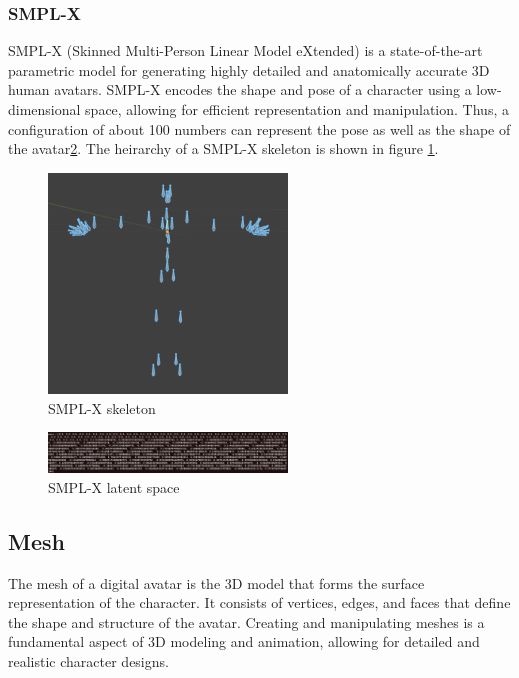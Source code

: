 \subsubsection{SMPL-X}

SMPL-X (Skinned Multi-Person Linear Model eXtended) is a state-of-the-art parametric model for generating highly detailed and anatomically accurate 3D human avatars. SMPL-X encodes the shape and pose of a character using a low-dimensional space, allowing for efficient representation and manipulation. Thus, a configuration of about 100 numbers can represent the pose as well as the shape of the avatar\ref{fig:latent_space_smplx}. The heirarchy of a SMPL-X skeleton is shown in figure \ref{fig:smpl_x_skeleton}.

\begin{figure}
  \centering \includegraphics[width = 2.5in]{images/background_work/smpl_x_skeleton.png}
  \caption{SMPL-X skeleton}
  \label{fig:smpl_x_skeleton}
\end{figure}

\begin{figure}
  \centering \includegraphics[width = 2.5in]{images/background_work/latent_space_smplx.png}
  \caption{SMPL-X latent space}
  \label{fig:latent_space_smplx}
\end{figure}

\subsection{Mesh}

The mesh of a digital avatar is the 3D model that forms the surface representation of the character. It consists of vertices, edges, and faces that define the shape and structure of the avatar. Creating and manipulating meshes is a fundamental aspect of 3D modeling and animation, allowing for detailed and realistic character designs.

